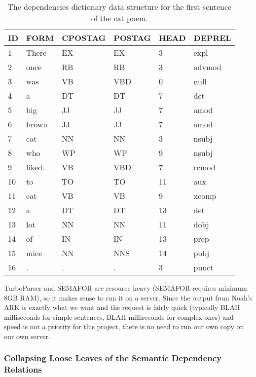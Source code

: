 \begin{table}
\centering
    \begin{tabular}{|l|l|l|l|l|l|}
    \hline
    ID & FORM   & CPOSTAG & POSTAG & HEAD & DEPREL \\ \hline
    1  & There  & EX      & EX     & 3    & expl   \\
    2  & once   & RB      & RB     & 3    & advmod \\
    3  & was    & VB      & VBD    & 0    & null   \\
    4  & a      & DT      & DT     & 7    & det    \\
    5  & big    & JJ      & JJ     & 7    & amod   \\
    6  & brown  & JJ      & JJ     & 7    & amod   \\
    7  & cat    & NN      & NN     & 3    & nsubj  \\
    8  & who    & WP      & WP     & 9    & nsubj  \\
    9  & liked. & VB      & VBD    & 7    & rcmod  \\
    10 & to     & TO      & TO     & 11   & aux    \\
    11 & eat    & VB      & VB     & 9    & xcomp  \\
    12 & a      & DT      & DT     & 13   & det    \\
    13 & lot    & NN      & NN     & 11   & dobj   \\
    14 & of     & IN      & IN     & 13   & prep   \\
    15 & mice   & NN      & NNS    & 14   & pobj   \\
    16 & .      & .       & .      & 3    & punct  \\ \hline
    \end{tabular}
\caption{The dependencies dictionary data structure for the first sentence of the cat poem.}
\label{tab:DepDict}
\end{table}

TurboParser and SEMAFOR are resource heavy (SEMAFOR requires minimum 8GB RAM), so it makes sense to run it on a server. Since the output from Noah's ARK is exactly what we want and the request is fairly quick (typically BLAH milliseconds for simple sentences, BLAH milliseconds for complex ones) and speed is not a priority for this project, there is no need to run our own copy on our own server.

\subsubsection{Collapsing Loose Leaves of the Semantic Dependency Relations}
\label{sec:collapse}

